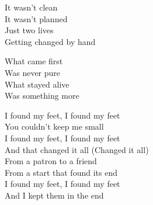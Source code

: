 \begin{lyrics}
It wasn’t clean\\
It wasn’t planned\\
Just two lives\\
Getting changed by hand

What came first\\
Was never pure\\
What stayed alive\\
Was something more

I found my feet, I found my feet\\
You couldn’t keep me small\\
I found my feet, I found my feet\\
And that changed it all
(Changed it all)\\
From a patron to a friend\\
From a start that found its end\\
I found my feet, I found my feet\\
And I kept them in the end
\end{lyrics}

